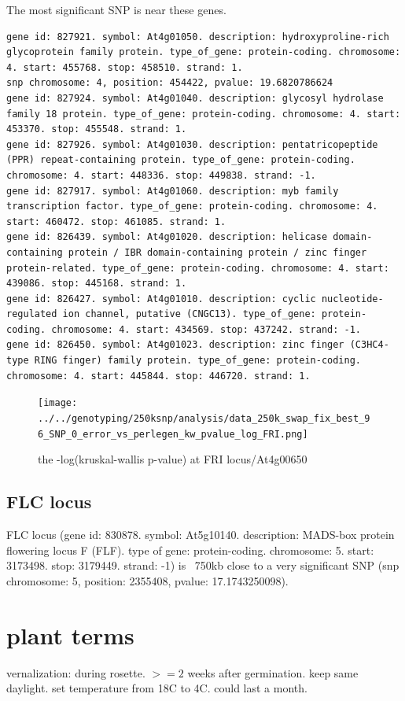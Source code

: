 \documentclass[a4paper,10pt]{article}
\begin{document}
The most significant SNP is near these genes.
\begin{verbatim}
gene id: 827921. symbol: At4g01050. description: hydroxyproline-rich glycoprotein family protein. type_of_gene: protein-coding. chromosome: 4. start: 455768. stop: 458510. strand: 1.
snp chromosome: 4, position: 454422, pvalue: 19.6820786624
gene id: 827924. symbol: At4g01040. description: glycosyl hydrolase family 18 protein. type_of_gene: protein-coding. chromosome: 4. start: 453370. stop: 455548. strand: 1.
gene id: 827926. symbol: At4g01030. description: pentatricopeptide (PPR) repeat-containing protein. type_of_gene: protein-coding. chromosome: 4. start: 448336. stop: 449838. strand: -1.
gene id: 827917. symbol: At4g01060. description: myb family transcription factor. type_of_gene: protein-coding. chromosome: 4. start: 460472. stop: 461085. strand: 1.
gene id: 826439. symbol: At4g01020. description: helicase domain-containing protein / IBR domain-containing protein / zinc finger protein-related. type_of_gene: protein-coding. chromosome: 4. start: 439086. stop: 445168. strand: 1.
gene id: 826427. symbol: At4g01010. description: cyclic nucleotide-regulated ion channel, putative (CNGC13). type_of_gene: protein-coding. chromosome: 4. start: 434569. stop: 437242. strand: -1.
gene id: 826450. symbol: At4g01023. description: zinc finger (C3HC4-type RING finger) family protein. type_of_gene: protein-coding. chromosome: 4. start: 445844. stop: 446720. strand: 1.
\end{verbatim}

\begin{figure}
\texttt{[image: ../../genotyping/250ksnp/analysis/data\_250k\_swap\_fix\_best\_96\_SNP\_0\_error\_vs\_perlegen\_kw\_pvalue\_log\_FRI.png]}
\caption{the -log(kruskal-wallis p-value) at FRI locus/At4g00650}\label{f31}
\end{figure}

\subsection{FLC locus}
FLC locus (gene id: 830878. symbol: At5g10140. description: MADS-box protein flowering locus F (FLF). type of gene: protein-coding. chromosome: 5. start: 3173498. stop: 3179449. strand: -1) is ~750kb close to a very significant SNP (snp chromosome: 5, position: 2355408, pvalue: 17.1743250098).

\section{plant terms}
vernalization: during rosette. $>=2$ weeks after germination. keep same daylight. set temperature from 18C to 4C. could last a month.
\end{document}
